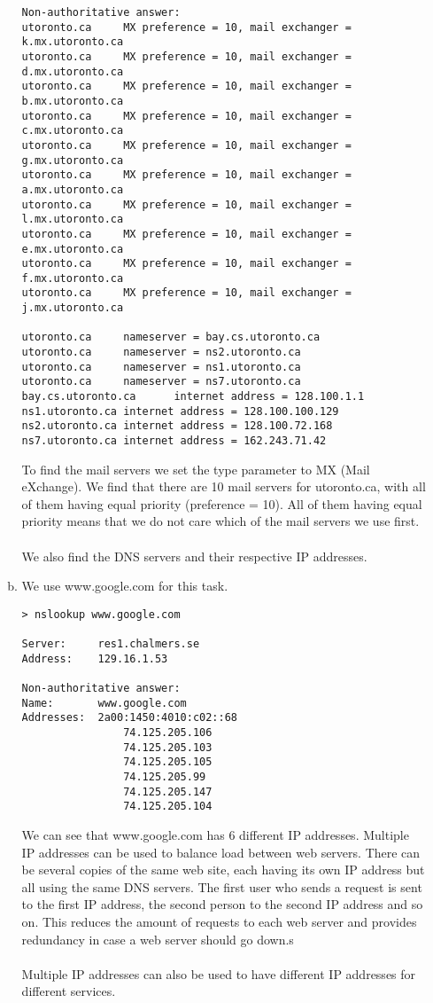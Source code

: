 \documentclass[a4paper,9pt,fleqn]{article}
\begin{document}
\begin{enumerate}[{Task} 1]
\begin{enumerate}[a)]
\begin{lstlisting}
Non-authoritative answer:
utoronto.ca     MX preference = 10, mail exchanger = k.mx.utoronto.ca
utoronto.ca     MX preference = 10, mail exchanger = d.mx.utoronto.ca
utoronto.ca     MX preference = 10, mail exchanger = b.mx.utoronto.ca
utoronto.ca     MX preference = 10, mail exchanger = c.mx.utoronto.ca
utoronto.ca     MX preference = 10, mail exchanger = g.mx.utoronto.ca
utoronto.ca     MX preference = 10, mail exchanger = a.mx.utoronto.ca
utoronto.ca     MX preference = 10, mail exchanger = l.mx.utoronto.ca
utoronto.ca     MX preference = 10, mail exchanger = e.mx.utoronto.ca
utoronto.ca     MX preference = 10, mail exchanger = f.mx.utoronto.ca
utoronto.ca     MX preference = 10, mail exchanger = j.mx.utoronto.ca

utoronto.ca     nameserver = bay.cs.utoronto.ca
utoronto.ca     nameserver = ns2.utoronto.ca
utoronto.ca     nameserver = ns1.utoronto.ca
utoronto.ca     nameserver = ns7.utoronto.ca
bay.cs.utoronto.ca      internet address = 128.100.1.1
ns1.utoronto.ca internet address = 128.100.100.129
ns2.utoronto.ca internet address = 128.100.72.168
ns7.utoronto.ca internet address = 162.243.71.42
\end{lstlisting}

		To find the mail servers we set the type parameter to {\outp MX} (Mail eXchange).
		We find that there are 10 mail servers for {\outp utoronto.ca}, with all of them
		having equal priority (preference = 10). All of them having equal priority
		means that we do not care which of the mail servers we use first. 
		\\ \\
		We also find the DNS servers and their respective IP addresses. 
		\\
		\item
		We use {\outp www.google.com} for this task.

\begin{lstlisting}
> nslookup www.google.com

Server:  	res1.chalmers.se
Address:  	129.16.1.53

Non-authoritative answer:
Name:    	www.google.com
Addresses:  2a00:1450:4010:c02::68
         		74.125.205.106
         		74.125.205.103
         		74.125.205.105
         		74.125.205.99
         		74.125.205.147
         		74.125.205.104
\end{lstlisting}

		We can see that www.google.com has 6 different IP addresses. Multiple IP addresses
		can be used to balance load between web servers. There can be several copies of the
		same web site, each having its own IP address but all using the same DNS servers. The
		first user who sends a request is sent to the first IP address, the second person to
		the second IP address and so on. This reduces the amount of requests to each web server
		and provides redundancy in case a web server should go down.s
		\\ \\
		Multiple IP addresses can also be used to have different IP addresses for different services.
	\end{enumerate}


\end{enumerate}
\end{document}
